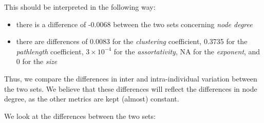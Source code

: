 \documentclass[
]{article}
\providecommand{\tightlist}{%
  \setlength{\itemsep}{0pt}\setlength{\parskip}{0pt}}
\begin{document}
This should be interpreted in the following way:

\begin{itemize}
\tightlist
\item
  there is a difference of -0.0068 between the two sets concerning
  \emph{node degree}
\item
  there are differences of 0.0083 for the \emph{clustering} coefficient,
  0.3735 for the \emph{pathlength} coefficient,
  \ensuremath{3\times 10^{-4}} for the \emph{assortativity}, NA for the
  \emph{exponent}, and 0 for the \emph{size}
\end{itemize}

Thus, we compare the differences in inter and intra-individual variation
between the two sets. We believe that these differences will reflect the
differences in node degree, as the other metrics are kept (almost)
constant.

We look at the differences between the two sets:
\end{document}
